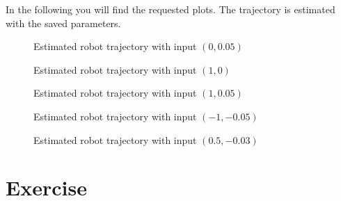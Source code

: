 \documentclass[conference]{IEEEtran}
\begin{document}
\begin{compactenum}[a)]
\item In the following you will find the requested plots. The trajectory is estimated with the saved parameters.
\begin{figure}[h!]
  	\centering
    \scalebox{.6}{}
    \caption{Estimated robot trajectory with input $(0,0.05)$}
    \label{fig:robotLR1}
\end{figure}
\begin{figure}[h!]
  	\centering
    \scalebox{.6}{}
    \caption{Estimated robot trajectory with input $(1,0)$}
    \label{fig:robotLR2}
\end{figure}
\begin{figure}[h!]
  	\centering
    \scalebox{.6}{}
    \caption{Estimated robot trajectory with input $(1,0.05)$}
    \label{fig:robotLR3}
\end{figure}
\begin{figure}[h!]
  	\centering
    \scalebox{.6}{}
    \caption{Estimated robot trajectory with input $(-1,-0.05)$}
    \label{fig:robotLR4}
\end{figure}
\begin{figure}[h!]
  	\centering
    \scalebox{.6}{}
    \caption{Estimated robot trajectory with input $(0.5,-0.03)$}
    \label{fig:robotLR5}
\end{figure}
\end{compactenum}

\newpage
\section{Exercise}
\end{document}
